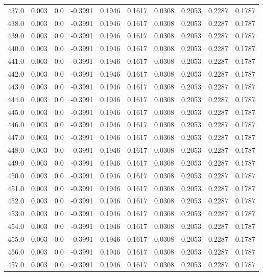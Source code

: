 \begin{longtable}{lrrrrrrrrr}
437.0 & 0.003 & 0.0 & -0.3991 & 0.1946 & 0.1617 & 0.0308 & 0.2053 & 0.2287 & 0.1787 \\
438.0 & 0.003 & 0.0 & -0.3991 & 0.1946 & 0.1617 & 0.0308 & 0.2053 & 0.2287 & 0.1787 \\
439.0 & 0.003 & 0.0 & -0.3991 & 0.1946 & 0.1617 & 0.0308 & 0.2053 & 0.2287 & 0.1787 \\
440.0 & 0.003 & 0.0 & -0.3991 & 0.1946 & 0.1617 & 0.0308 & 0.2053 & 0.2287 & 0.1787 \\
441.0 & 0.003 & 0.0 & -0.3991 & 0.1946 & 0.1617 & 0.0308 & 0.2053 & 0.2287 & 0.1787 \\
442.0 & 0.003 & 0.0 & -0.3991 & 0.1946 & 0.1617 & 0.0308 & 0.2053 & 0.2287 & 0.1787 \\
443.0 & 0.003 & 0.0 & -0.3991 & 0.1946 & 0.1617 & 0.0308 & 0.2053 & 0.2287 & 0.1787 \\
444.0 & 0.003 & 0.0 & -0.3991 & 0.1946 & 0.1617 & 0.0308 & 0.2053 & 0.2287 & 0.1787 \\
445.0 & 0.003 & 0.0 & -0.3991 & 0.1946 & 0.1617 & 0.0308 & 0.2053 & 0.2287 & 0.1787 \\
446.0 & 0.003 & 0.0 & -0.3991 & 0.1946 & 0.1617 & 0.0308 & 0.2053 & 0.2287 & 0.1787 \\
447.0 & 0.003 & 0.0 & -0.3991 & 0.1946 & 0.1617 & 0.0308 & 0.2053 & 0.2287 & 0.1787 \\
448.0 & 0.003 & 0.0 & -0.3991 & 0.1946 & 0.1617 & 0.0308 & 0.2053 & 0.2287 & 0.1787 \\
449.0 & 0.003 & 0.0 & -0.3991 & 0.1946 & 0.1617 & 0.0308 & 0.2053 & 0.2287 & 0.1787 \\
450.0 & 0.003 & 0.0 & -0.3991 & 0.1946 & 0.1617 & 0.0308 & 0.2053 & 0.2287 & 0.1787 \\
451.0 & 0.003 & 0.0 & -0.3991 & 0.1946 & 0.1617 & 0.0308 & 0.2053 & 0.2287 & 0.1787 \\
452.0 & 0.003 & 0.0 & -0.3991 & 0.1946 & 0.1617 & 0.0308 & 0.2053 & 0.2287 & 0.1787 \\
453.0 & 0.003 & 0.0 & -0.3991 & 0.1946 & 0.1617 & 0.0308 & 0.2053 & 0.2287 & 0.1787 \\
454.0 & 0.003 & 0.0 & -0.3991 & 0.1946 & 0.1617 & 0.0308 & 0.2053 & 0.2287 & 0.1787 \\
455.0 & 0.003 & 0.0 & -0.3991 & 0.1946 & 0.1617 & 0.0308 & 0.2053 & 0.2287 & 0.1787 \\
456.0 & 0.003 & 0.0 & -0.3991 & 0.1946 & 0.1617 & 0.0308 & 0.2053 & 0.2287 & 0.1787 \\
457.0 & 0.003 & 0.0 & -0.3991 & 0.1946 & 0.1617 & 0.0308 & 0.2053 & 0.2287 & 0.1787 \\

\end{longtable}
